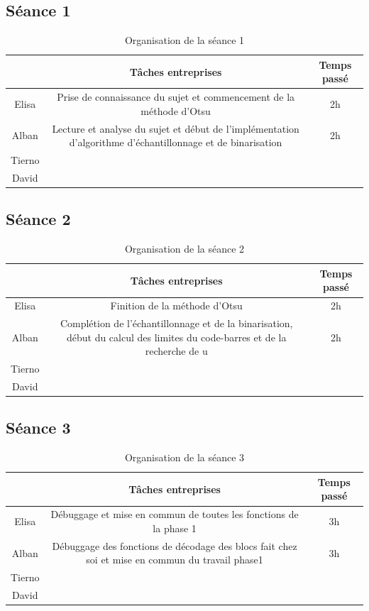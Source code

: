 \documentclass{rapport}
\begin{document}
\subsection{Séance 1}

\begin{table}[H]
	\centering 
	\begin{tabular}{c|c|c}
		& Tâches entreprises& Temps passé\\ \hline
		Elisa& Prise de connaissance du sujet et commencement de la méthode d'Otsu& 2h\\ \hline
		Alban& Lecture et analyse du sujet et début de l'implémentation d'algorithme d'échantillonnage et de binarisation& 2h\\ \hline
		Tierno& & \\ \hline
		David& & 
	\end{tabular}
	\caption{Organisation de la séance 1}
\end{table}

\subsection{Séance 2}

\begin{table}[H]
	\centering 
	\begin{tabular}{c|c|c}
		& Tâches entreprises& Temps passé\\ \hline
		Elisa& Finition de la méthode d'Otsu & 2h\\ \hline
		Alban& Complétion de l'échantillonnage et de la binarisation, début du calcul des limites du code-barres et de la recherche de u& 2h\\ \hline
		Tierno& & \\ \hline
		David& & 
	\end{tabular}
	\caption{Organisation de la séance 2}
\end{table}

\subsection{Séance 3}

\begin{table}[H]
	\centering 
	\begin{tabular}{c|c|c}
		& Tâches entreprises& Temps passé\\ \hline
		Elisa& Débuggage et mise en commun de toutes les fonctions de la phase 1 & 3h\\ \hline
		Alban& Débuggage des fonctions de décodage des blocs fait chez soi et mise en commun du travail phase1& 3h\\ \hline
		Tierno& & \\ \hline
		David& & 
	\end{tabular}
	\caption{Organisation de la séance 3}
\end{table}
\end{document}
